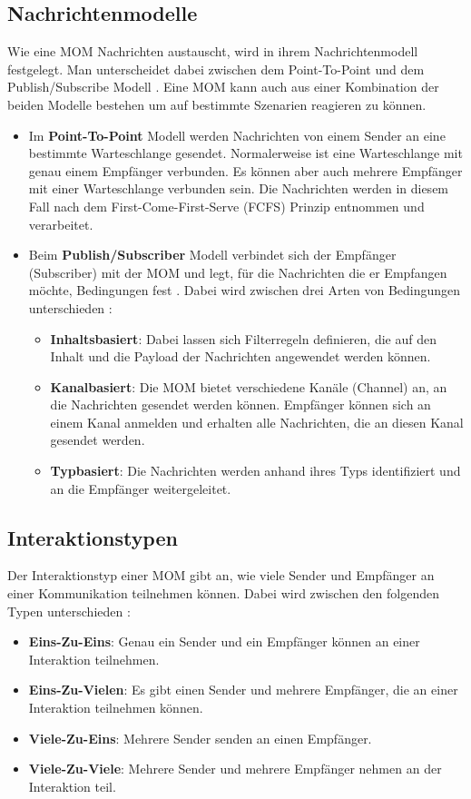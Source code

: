 \subsection{Nachrichtenmodelle}
\label{sec:nachrichtenmodelle}
Wie eine MOM Nachrichten austauscht, wird in ihrem Nachrichtenmodell festgelegt. Man unterscheidet dabei zwischen dem Point-To-Point und dem Publish/Subscribe Modell \cite{Curry05}. Eine MOM kann auch aus einer Kombination der beiden Modelle bestehen um auf bestimmte Szenarien reagieren zu können.
\begin{itemize}
\item Im \textbf{Point-To-Point} Modell werden Nachrichten von einem Sender an eine bestimmte  Warteschlange gesendet. Normalerweise ist eine Warteschlange mit genau einem Empfänger verbunden. Es können aber auch mehrere Empfänger mit einer Warteschlange verbunden sein. Die Nachrichten werden in diesem Fall nach dem First-Come-First-Serve (FCFS) Prinzip entnommen und verarbeitet. 
\item Beim \textbf{Publish/Subscriber} Modell verbindet sich der Empfänger (Subscriber) mit der MOM und legt, für die Nachrichten die er Empfangen möchte, Bedingungen fest \cite{Eugster03}. Dabei wird zwischen drei Arten von Bedingungen unterschieden \cite{Rathfelder2013}:
\begin{itemize}
    \item \textbf{Inhaltsbasiert}: Dabei lassen sich Filterregeln definieren, die auf den Inhalt und die Payload der Nachrichten angewendet werden können.
    \item \textbf{Kanalbasiert}: Die MOM bietet verschiedene Kanäle (Channel) an, an die Nachrichten gesendet werden können. Empfänger können sich an einem Kanal anmelden und erhalten alle Nachrichten, die an diesen Kanal gesendet werden.
    \item \textbf{Typbasiert}: Die Nachrichten werden anhand ihres Typs identifiziert und an die Empfänger weitergeleitet.
\end{itemize}
\end{itemize}

\subsection{Interaktionstypen}
Der Interaktionstyp einer MOM gibt an, wie viele Sender und Empfänger an einer Kommunikation teilnehmen können. Dabei wird zwischen den folgenden Typen unterschieden \cite{Rathfelder2013}:
\begin{itemize}
    \item \textbf{Eins-Zu-Eins}: Genau ein Sender und ein Empfänger können an einer Interaktion teilnehmen.
    \item \textbf{Eins-Zu-Vielen}: Es gibt einen Sender und mehrere Empfänger, die an einer Interaktion teilnehmen können. 
    \item \textbf{Viele-Zu-Eins}: Mehrere Sender senden an einen Empfänger.
    \item \textbf{Viele-Zu-Viele}: Mehrere Sender und mehrere Empfänger nehmen an der Interaktion teil.
\end{itemize}

